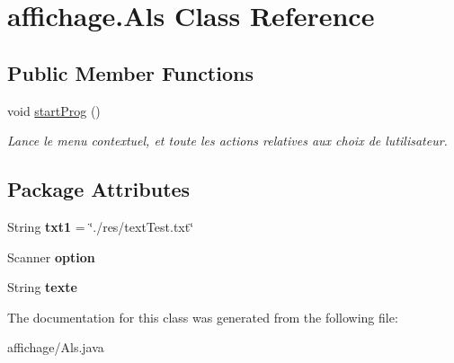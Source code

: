 \hypertarget{classaffichage_1_1_als}{}\section{affichage.\+Als Class Reference}
\label{classaffichage_1_1_als}
\subsection*{Public Member Functions}
\begin{DoxyCompactItemize}
\item 
void \hyperlink{classaffichage_1_1_als_a31c2063eab5cb1b14270f2abfc86b998}{start\+Prog} ()\hypertarget{classaffichage_1_1_als_a31c2063eab5cb1b14270f2abfc86b998}{}\label{classaffichage_1_1_als_a31c2063eab5cb1b14270f2abfc86b998}

\begin{DoxyCompactList}\small\item\em Lance le menu contextuel, et toute les actions relatives aux choix de l\textquotesingle{}utilisateur. \end{DoxyCompactList}\end{DoxyCompactItemize}
\subsection*{Package Attributes}
\begin{DoxyCompactItemize}
\item 
String {\bfseries txt1} = \char`\"{}./res/text\+Test.\+txt\char`\"{}\hypertarget{classaffichage_1_1_als_ab6f8152fb5c01e79a963888ac9ce31dd}{}\label{classaffichage_1_1_als_ab6f8152fb5c01e79a963888ac9ce31dd}

\item 
Scanner {\bfseries option}\hypertarget{classaffichage_1_1_als_a4a6b07c25403db206628f48e8f1c4bae}{}\label{classaffichage_1_1_als_a4a6b07c25403db206628f48e8f1c4bae}

\item 
String {\bfseries texte}\hypertarget{classaffichage_1_1_als_a5998b838a69ed843df6fa55e39b54b43}{}\label{classaffichage_1_1_als_a5998b838a69ed843df6fa55e39b54b43}

\end{DoxyCompactItemize}


The documentation for this class was generated from the following file\+:\begin{DoxyCompactItemize}
\item 
affichage/Als.\+java\end{DoxyCompactItemize}
